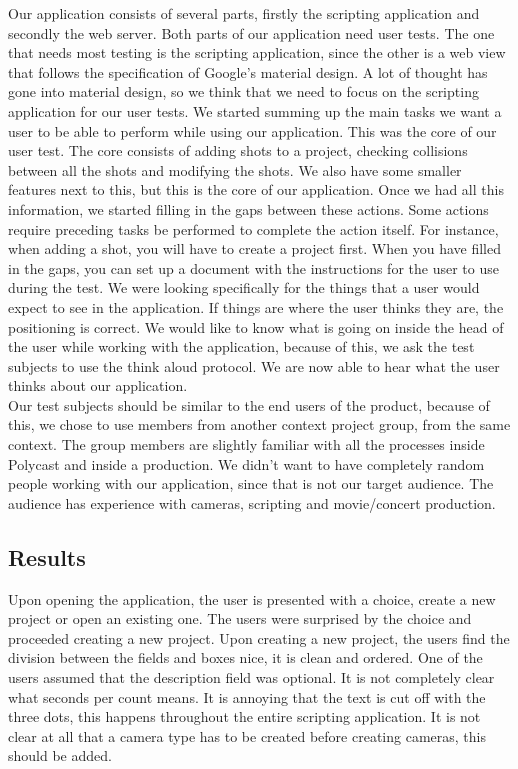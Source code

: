 Our application consists of several parts, firstly the scripting application and secondly the web server. Both parts of our application need user tests. The one that needs most testing is the scripting application, since the other is a web view that follows the specification of Google's material design. A lot of thought has gone into material design, so we think that we need to focus on the scripting application for our user tests. We started summing up the main tasks we want a user to be able to perform while using our application. This was the core of our user test. The core consists of adding shots to a project, checking collisions between all the shots and modifying the shots. We also have some smaller features next to this, but this is the core of our application. Once we had all this information, we started filling in the gaps between these actions. Some actions require preceding tasks be performed to complete the action itself. For instance, when adding a shot, you will have to create a project first. When you have filled in the gaps, you can set up a document with the instructions for the user to use during the test. We were looking specifically for the things that a user would expect to see in the application. If things are where the user thinks they are, the positioning is correct. We would like to know what is going on inside the head of the user while working with the application, because of this, we ask the test subjects to use the think aloud protocol. We are now able to hear what the user thinks about our application.\\

Our test subjects should be similar to the end users of the product, because of this, we chose to use members from another context project group, from the same context. The group members are slightly familiar with all the processes inside Polycast and inside a production. We didn't want to have completely random people working with our application, since that is not our target audience. The audience has experience with cameras, scripting and movie/concert production.
\subsection{Results}
Upon opening the application, the user is presented with a choice, create a new project or open an existing one. The users were surprised by the choice and proceeded creating a new project. Upon creating a new project, the users find the division between the fields and boxes nice, it is clean and ordered. One of the users assumed that the description field was optional. It is not completely clear what seconds per count means. It is annoying that the text is cut off with the three dots, this happens throughout the entire scripting application. It is not clear at all that a camera type has to be created before creating cameras, this should be added.\\

